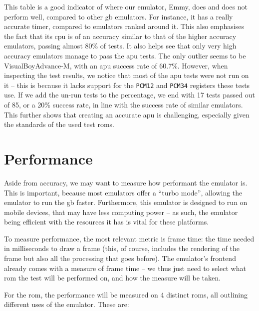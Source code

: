 \documentclass[11pt]{informatics-report}
\begin{document}
This table is a good indicator of where our emulator, Emmy, does and does not perform well, compared to other \gls{gb} emulators. For instance, it has a really accurate timer, compared to emulators ranked around it. This also emphasises the fact that its \gls{cpu} is of an accuracy similar to that of the higher accuracy emulators, passing almost 80\% of tests. It also helps see that only very high accuracy emulators manage to pass the \gls{apu} tests. The only outlier seems to be VisualBoyAdvance-M, with an \gls{apu} success rate of 60.7\%. However, when inspecting the test results, we notice that most of the \gls{apu} tests were not run on it -- this is because it lacks support for the \texttt{PCM12} and \texttt{PCM34} registers these tests use. If we add the un-run tests to the percentage, we end with 17 tests passed out of 85, or a 20\% success rate, in line with the success rate of similar emulators. This further shows that creating an accurate \gls{apu} is challenging, especially given the standards of the used test \glspl{rom}.

\section{Performance}

Aside from accuracy, we may want to measure how performant the emulator is. This is important, because most emulators offer a ``turbo mode'', allowing the emulator to run the \gls{gb} faster. Furthermore, this emulator is designed to run on mobile devices, that may have less computing power -- as such, the emulator being efficient with the resources it has is vital for these platforms.

To measure performance, the most relevant metric is frame time: the time needed in milliseconds to draw a frame (this, of course, includes the rendering of the frame but also all the processing that goes before). The emulator's frontend already comes with a measure of frame time -- we thus just need to select what \gls{rom} the test will be performed on, and how the measure will be taken.

For the \gls{rom}, the performance will be measured on 4 distinct \glspl{rom}, all outlining different uses of the emulator. These are:
\end{document}
